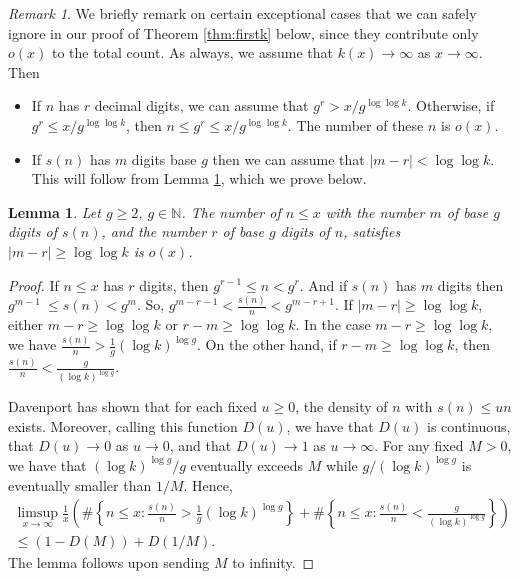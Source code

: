 \documentclass[11pt, reqno]{amsart}
\newtheorem{lemma}[theorem]{Lemma}
\theoremstyle{remark}
\newtheorem*{remark}{Remark}
\numberwithin{theorem}{section}
\numberwithin{proposition}{section}
\numberwithin{lemma}{section}
\numberwithin{corollary}{section}
\numberwithin{equation}{section}
\numberwithin{conjecture}{section}
\numberwithin{definition}{section}
\begin{document}
\begin{remark} We briefly remark on certain exceptional cases that we can safely ignore in our proof of Theorem \ref{thm:firstk} below, since they contribute only $o(x)$ to the total count. As always, we assume that $k(x)\to \infty$ as $x\to \infty$. Then 
\begin{itemize}
    \item If $n$ has $r$ decimal digits, we can assume that $g^{r} > x/g^{\log \log k}$.  Otherwise, if $g^r \leq x/g^{\log \log k}$, then $n\leq g^{r} \leq x/g^{\log \log k}.$ The number of these $n$ is $o(x)$. 
    
    \item If $s(n)$ has $m$ digits base $g$ then we can assume that $|m-r| < \log \log k$. This will follow from Lemma \ref{lem:m-r}, which we prove below. 
    

\end{itemize}

\end{remark}

\begin{lemma}\label{lem:m-r} Let $g\geq 2$, $g\in \mathbb{N}$. The number of $n\leq x$ 
    with the number $m$ of base $g$ digits of $s(n)$, and the number $r$ of base $g$ digits of $n$, satisfies $|m-r| \geq \log \log k$ is $o(x)$.
    
\end{lemma}


    \begin{proof}
If $n\leq x$ has $r$ digits, then $g^{r-1}\leq n< g^r$. And if $s(n)$ has $m$ digits then $g^{m-1}\
 \leq s(n)< g^{m}$. So, $g^{m-r-1}< \frac{s(n)}{n}< g^{m-r+1}$. If $|m-r| \ge \log\log k$,  either $m-r \ge \log\log{k}$ or $r-m \ge \log\log{k}$. In the case $m-r\ge \log\log{k}$, we have $\frac{s(n)}{n}>\frac{1}{g}(\log k)^{\log g}$. On the other hand, if $r-m\ge \log\log{k}$, then $\frac{s(n)}{n} < \frac{g}{(\log{k})^{\log{g}}}$.  
 
Davenport \cite{davenport33} has shown that for each fixed $u\ge 0$, the density of $n$ with $s(n)\le un$ exists. Moreover, calling this function $D(u)$, we have that $D(u)$ is continuous, that $D(u) \to 0$ as $u\to  0$, and that $D(u)\to 1$ as $u\to\infty$. For any fixed $M>0$, we have that $(\log{k})^{\log{g}}/g$ eventually exceeds $M$ while $g/(\log{k})^{\log{g}}$ is eventually smaller than $1/M$. Hence,
\begin{multline*} \limsup_{x\to\infty}\frac1x\left(\#\left\{n\leq  x: \frac{s(n)}{n}>\frac{1}{g}(\log k)^{\log g}\right\}+\# \left\{n\leq x: \frac{s(n)}{n}<\frac{g}{(\log k)^{\log g}}\right\}\right)\\
\leq (1-D(M))+D(1/M).
\end{multline*}
The lemma follows upon sending $M$ to infinity.\end{proof}
\end{document}
